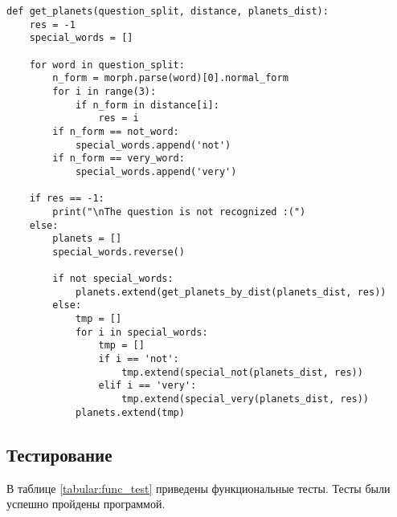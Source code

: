 \clearpage

\begin{lstlisting}[label=lst:get, caption=Реализация алгоритма получения удовлетворяющих заданному ограничению объектов]
def get_planets(question_split, distance, planets_dist):
    res = -1
    special_words = []

    for word in question_split:
        n_form = morph.parse(word)[0].normal_form
        for i in range(3):
            if n_form in distance[i]:
                res = i
        if n_form == not_word:
            special_words.append('not')
        if n_form == very_word:
            special_words.append('very')

    if res == -1:
        print("\nThe question is not recognized :(")
    else:
        planets = []
        special_words.reverse()

        if not special_words:
            planets.extend(get_planets_by_dist(planets_dist, res))
        else:
            tmp = []
            for i in special_words:
                tmp = []
                if i == 'not':
                    tmp.extend(special_not(planets_dist, res))
                elif i == 'very':
                    tmp.extend(special_very(planets_dist, res))
            planets.extend(tmp)
\end{lstlisting}
\captionsetup{justification=centering}

\vspace{\baselineskip}
\subsection{Тестирование}
\vspace{\baselineskip}

В таблице \ref{tabular:func_test} приведены функциональные тесты. 
Тесты были успешно пройдены программой.

